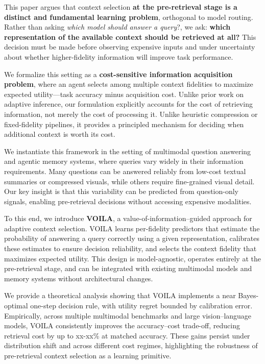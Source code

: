 This paper argues that context selection \textbf{at the pre-retrieval stage is a distinct and fundamental learning problem}, orthogonal to model routing. Rather than asking \textit{which model should answer a query}?, we ask:
\textbf{which representation of the available context should be retrieved at all?}
This decision must be made before observing expensive inputs and under uncertainty about whether higher-fidelity information will improve task performance.

We formalize this setting as a \textbf{cost-sensitive information acquisition problem}, where an agent selects among multiple context fidelities to maximize expected utility—task accuracy minus acquisition cost. Unlike prior work on adaptive inference, our formulation explicitly accounts for the cost of retrieving information, not merely the cost of processing it. Unlike heuristic compression or fixed-fidelity pipelines, it provides a principled mechanism for deciding when additional context is worth its cost.

We instantiate this framework in the setting of multimodal question answering and agentic memory systems, where queries vary widely in their information requirements. Many questions can be answered reliably from low-cost textual summaries or compressed visuals, while others require fine-grained visual detail. Our key insight is that this variability can be predicted from question-only signals, enabling pre-retrieval decisions without accessing expensive modalities.

To this end, we introduce \textbf{VOILA}, a value-of-information–guided approach for adaptive context selection. VOILA learns per-fidelity predictors that estimate the probability of answering a query correctly using a given representation, calibrates these estimates to ensure decision reliability, and selects the context fidelity that maximizes expected utility. This design is model-agnostic, operates entirely at the pre-retrieval stage, and can be integrated with existing multimodal models and memory systems without architectural changes.

We provide a theoretical analysis showing that VOILA implements a near Bayes-optimal one-step decision rule, with utility regret bounded by calibration error. Empirically, across multiple multimodal benchmarks and large vision–language models, VOILA consistently improves the accuracy–cost trade-off, reducing retrieval cost by up to xx-xx\% at matched accuracy. These gains persist under distribution shift and across different cost regimes, highlighting the robustness of pre-retrieval context selection as a learning primitive.

